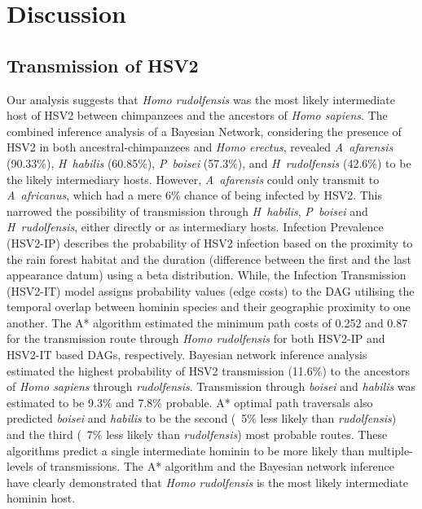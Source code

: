 \documentclass[fleqn,10pt]{wlscirep}
\begin{document}
\section*{Discussion}
\subsection*{Transmission of HSV2}
Our analysis suggests that \textit{Homo rudolfensis} was the most likely intermediate host of HSV2 between chimpanzees and the ancestors of \textit{Homo sapiens}. The combined inference analysis of a Bayesian Network, considering the presence of HSV2 in both ancestral-chimpanzees and \textit{Homo erectus}, revealed \textit{A~afarensis} (90.33\%), \textit{H~habilis} (60.85\%), \textit{P~boisei} (57.3\%), and \textit{H~rudolfensis} (42.6\%) to be the likely intermediary hosts. However, \textit{A~afarensis} could only transmit to \textit{A~africanus}, which had a mere 6\% chance of being infected by HSV2. This narrowed the possibility of transmission through \textit{H~habilis}, \textit{P~boisei} and \textit{H~rudolfensis}, either directly or as intermediary hosts. Infection Prevalence (HSV2-IP) describes the probability of HSV2 infection based on the proximity to the rain forest habitat and the duration (difference between the first and the last appearance datum) using a beta distribution. While, the Infection Transmission (HSV2-IT) model assigns probability values (edge costs) to the DAG utilising the temporal overlap between hominin species and their geographic proximity to one another. The A* algorithm estimated the minimum path costs of 0.252 and 0.87 for the transmission route through \textit{Homo rudolfensis} for both HSV2-IP and HSV2-IT based DAGs, respectively. Bayesian network inference analysis estimated the highest probability of HSV2 transmission (11.6\%) to the ancestors of \textit{Homo sapiens} through \textit{rudolfensis}. Transmission through \textit{boisei} and \textit{habilis} was estimated to be 9.3\% and 7.8\% probable. A* optimal path traversals also predicted \textit{boisei} and \textit{habilis} to be the second (~5\% less likely than \textit{rudolfensis}) and the third (~7\% less likely than \textit{rudolfensis}) most probable routes. These algorithms predict a single intermediate hominin to be more likely than multiple-levels of transmissions. The A* algorithm and the Bayesian network inference have clearly demonstrated that \textit{Homo rudolfensis} is the most likely intermediate hominin host.  
\end{document}
